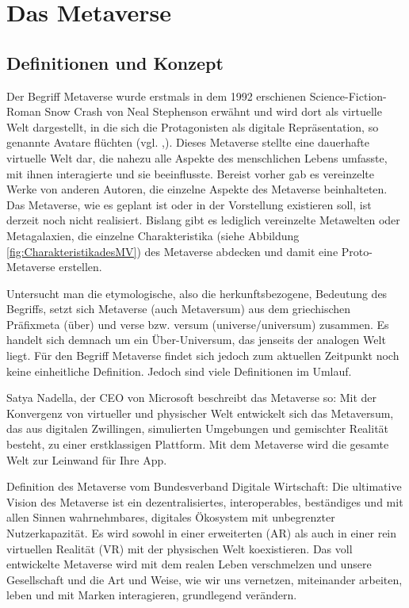 \chapter{Das Metaverse}\label{ch:Metaverse}

\section{Definitionen und Konzept}

Der Begriff \glqq Metaverse\grqq{} wurde erstmals in dem 1992 erschienen Science-Fiction-Roman \glqq Snow Crash\grqq{} von Neal Stephenson erwähnt und wird dort als virtuelle Welt dargestellt, in die sich die Protagonisten als digitale Repräsentation, so genannte \glqq Avatare\grqq{} flüchten (vgl. \cite{DripSnow},\cite{MVkompaktSnow}). Dieses Metaverse stellte eine dauerhafte virtuelle Welt dar, die nahezu alle Aspekte des menschlichen Lebens umfasste, mit ihnen interagierte und sie beeinflusste. Bereist vorher gab es vereinzelte Werke von anderen Autoren, die einzelne Aspekte des Metaverse beinhalteten. Das Metaverse, wie es geplant ist oder in der Vorstellung existieren soll, ist derzeit noch nicht realisiert. Bislang gibt es lediglich vereinzelte \glqq Metawelten\grqq{} oder \glqq Metagalaxien\grqq{}, die einzelne Charakteristika (siehe Abbildung \ref*{fig:CharakteristikadesMV}) des Metaverse abdecken und damit eine Proto-Metaverse erstellen. 

Untersucht man die etymologische, also die herkunftsbezogene, Bedeutung des Begriffs, setzt sich Metaverse (auch Metaversum) aus dem griechischen Präfix\glqq meta\grqq{} (über) und \glqq verse\grqq{} bzw. \glqq versum\grqq{} (universe/universum) zusammen. Es handelt sich demnach um ein Über-Universum, das jenseits der analogen Welt liegt. Für den Begriff Metaverse findet sich jedoch zum aktuellen Zeitpunkt noch keine einheitliche Definition. Jedoch sind viele Definitionen im Umlauf.

Satya Nadella, der CEO von Microsoft beschreibt das Metaverse so: \glqq Mit der Konvergenz von virtueller und physischer Welt entwickelt sich das Metaversum, das aus digitalen Zwillingen, simulierten Umgebungen und gemischter Realität besteht, zu einer erstklassigen Plattform. Mit dem Metaverse wird die gesamte Welt zur Leinwand für Ihre App.\grqq{} \cite[frei übersetzt]{MicDef}

Definition des Metaverse vom Bundesverband Digitale Wirtschaft: \glqq Die ultimative Vision des Metaverse ist ein dezentralisiertes, interoperables, beständiges und mit allen Sinnen wahrnehmbares, digitales Ökosystem mit unbegrenzter Nutzerkapazität. Es wird sowohl in einer erweiterten (AR) als auch in einer rein virtuellen Realität (VR) mit der physischen Welt koexistieren. Das voll entwickelte Metaverse wird mit dem realen Leben verschmelzen und unsere Gesellschaft und die Art und Weise, wie wir uns vernetzen, miteinander arbeiten, leben und mit Marken interagieren, grundlegend verändern. \grqq{} \cite{BVDWDef}

